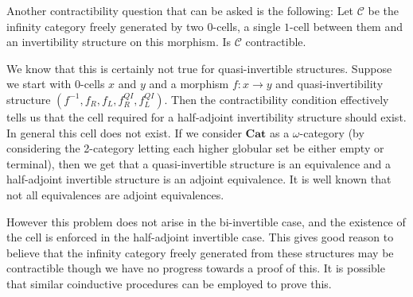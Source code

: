 \documentclass[draft]{article}
\newcommand{\inv}[1]{#1^{-1}} \newcommand{\comp}{\star}
\begin{document}
Another contractibility question that can be asked is the following:
Let \(\mathcal{C}\) be the infinity category freely generated by two
\(0\)-cells, a single \(1\)-cell between them and an invertibility
structure on this morphism. Is \(\mathcal{C}\) contractible.

We know that this is certainly not true for quasi-invertible
structures. Suppose we start with \(0\)-cells \(x\) and \(y\) and a
morphism \(f : x \to y\) and quasi-invertibility structure \((\inv f,
f_R, f_L, f_R^{QI}, f_L^{QI})\). Then the contractibility condition
effectively tells us that the cell required for a half-adjoint
invertibility structure should exist. In general this cell does not
exist. If we consider \(\mathbf{Cat}\) as a \(\omega\)-category (by
considering the 2-category letting each higher globular set be either
empty or terminal), then we get that a quasi-invertible structure is
an equivalence and a half-adjoint invertible structure is an adjoint
equivalence. It is well known that not all equivalences are adjoint
equivalences.

However this problem does not arise in the bi-invertible case, and the
existence of the cell is enforced in the half-adjoint invertible case.
This gives good reason to believe that the infinity category freely
generated from these structures may be contractible though we have no
progress towards a proof of this. It is possible that similar
coinductive procedures can be employed to prove this.



\printbibliography{}
\end{document}

